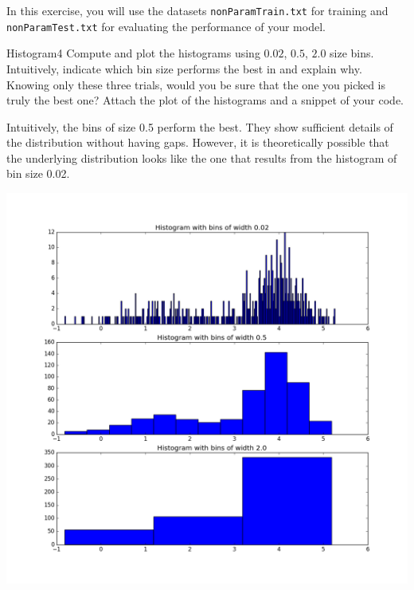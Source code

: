 \newif\ifvimbug
\vimbugfalse

\ifvimbug

\fi

 
In this exercise, you will use the datasets \texttt{nonParamTrain.txt} for training and \texttt{nonParamTest.txt} for evaluating the performance of your model.

\begin{questions}


\begin{question}{Histogram}{4}
Compute and plot the histograms using $0.02$, $0.5$, $2.0$ size bins.  
Intuitively, indicate which bin size performs the best in and explain why. Knowing only these three trials, would you be sure that the one you picked is truly the best one? Attach the plot of the histograms and a snippet of your code.


\begin{answer}
Intuitively, the bins of size 0.5 perform the best. They show sufficient details of the distribution without having gaps. However, it is theoretically possible that the underlying distribution looks like the one that results from the histogram of bin size 0.02.

\centering \includegraphics[width=0.6\linewidth]{dataSets/2-3-a}\label{fig:hist}




\end{answer}


\end{question}
\end{questions}

